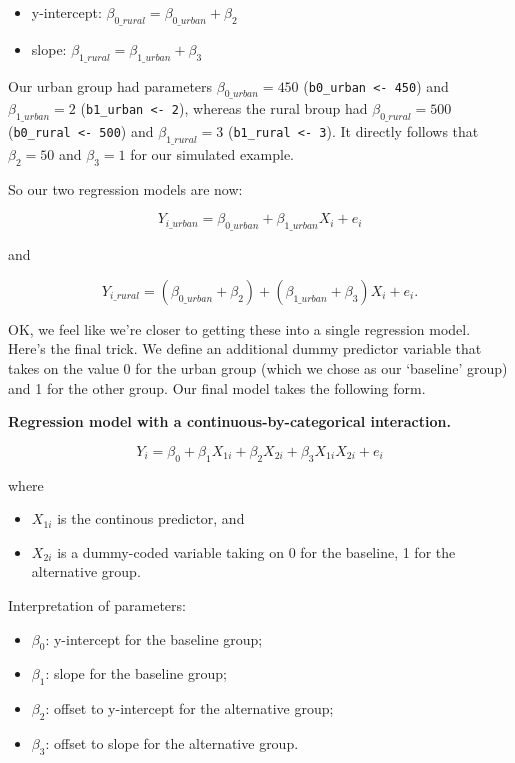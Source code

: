 \documentclass[]{book}
\providecommand{\tightlist}{%
  \setlength{\itemsep}{0pt}\setlength{\parskip}{0pt}}
\begin{document}
\begin{itemize}
\tightlist
\item
  y-intercept: \(\beta_{0\_rural} = \beta_{0\_urban} + \beta_2\)
\item
  slope: \(\beta_{1\_rural} = \beta_{1\_urban} + \beta_3\)
\end{itemize}

Our urban group had parameters \(\beta_{0\_urban} = 450\) (\texttt{b0\_urban\ \textless{}-\ 450}) and \(\beta_{1\_urban} = 2\) (\texttt{b1\_urban\ \textless{}-\ 2}), whereas the rural broup had \(\beta_{0\_rural} = 500\) (\texttt{b0\_rural\ \textless{}-\ 500}) and \(\beta_{1\_rural} = 3\) (\texttt{b1\_rural\ \textless{}-\ 3}). It directly follows that \(\beta_2 = 50\) and \(\beta_3 = 1\) for our simulated example.

So our two regression models are now:

\[Y_{i\_urban} = \beta_{0\_urban} + \beta_{1\_urban} X_i + e_i\]

and

\[Y_{i\_rural} = (\beta_{0\_urban} + \beta_2) + (\beta_{1\_urban} + \beta_3) X_i + e_i.\]

OK, we feel like we're closer to getting these into a single regression model. Here's the final trick. We define an additional dummy predictor variable that takes on the value 0 for the urban group (which we chose as our `baseline' group) and 1 for the other group. Our final model takes the following form.

\textbf{Regression model with a continuous-by-categorical interaction.}

\[Y_{i} = \beta_0 + \beta_1 X_{1i} + \beta_2 X_{2i} + \beta_3 X_{1i} X_{2i} + e_{i}\]

where

\begin{itemize}
\tightlist
\item
  \(X_{1i}\) is the continous predictor, and
\item
  \(X_{2i}\) is a dummy-coded variable taking on 0 for the baseline, 1 for the alternative group.
\end{itemize}

Interpretation of parameters:

\begin{itemize}
\tightlist
\item
  \(\beta_0\): y-intercept for the baseline group;
\item
  \(\beta_1\): slope for the baseline group;
\item
  \(\beta_2\): offset to y-intercept for the alternative group;
\item
  \(\beta_3\): offset to slope for the alternative group.
\end{itemize}
\end{document}

